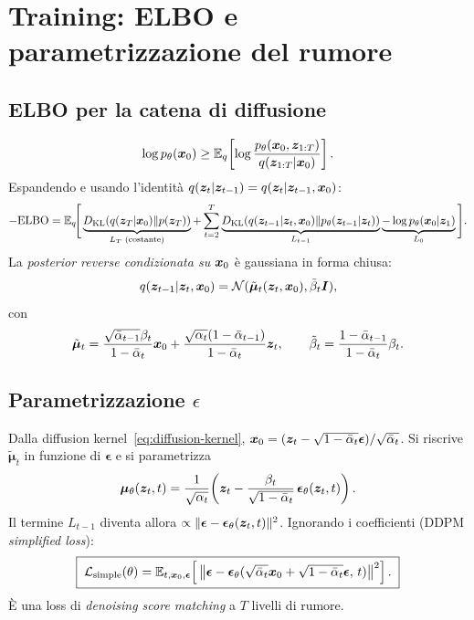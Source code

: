 \section{Training: ELBO e parametrizzazione del rumore}

\subsection{ELBO per la catena di diffusione}
\[
\log p_\theta(\bm{x}_0) \geq \mathbb{E}_q\!\left[\log \frac{p_\theta(\bm{x}_0, \bm{z}_{1:T})}{q(\bm{z}_{1:T}|\bm{x}_0)}\right].
\]
Espandendo e usando l'identità $q(\bm{z}_t|\bm{z}_{t-1}) = q(\bm{z}_t|\bm{z}_{t-1},\bm{x}_0)$:
\[
-\text{ELBO} = \mathbb{E}_q\!\Bigg[\underbrace{D_{\mathrm{KL}}\!\left(q(\bm{z}_T|\bm{x}_0) \| p(\bm{z}_T)\right)}_{L_T \text{ (costante)}} + \sum_{t=2}^T \underbrace{D_{\mathrm{KL}}\!\left(q(\bm{z}_{t-1}|\bm{z}_t,\bm{x}_0) \| p_\theta(\bm{z}_{t-1}|\bm{z}_t)\right)}_{L_{t-1}} \underbrace{- \log p_\theta(\bm{x}_0|\bm{z}_1)}_{L_0}\Bigg].
\]
La \emph{posterior reverse condizionata su $\bm{x}_0$} è gaussiana in forma chiusa:
\[
q(\bm{z}_{t-1}|\bm{z}_t, \bm{x}_0) = \mathcal{N}(\tilde{\boldsymbol{\mu}}_t(\bm{z}_t, \bm{x}_0), \tilde\beta_t \bm{I}),
\]
con
\[
\tilde{\boldsymbol{\mu}}_t = \frac{\sqrt{\bar\alpha_{t-1}}\beta_t}{1-\bar\alpha_t} \bm{x}_0 + \frac{\sqrt{\alpha_t}(1-\bar\alpha_{t-1})}{1-\bar\alpha_t}\bm{z}_t, \qquad \tilde\beta_t = \frac{1-\bar\alpha_{t-1}}{1-\bar\alpha_t}\beta_t.
\]

\subsection{Parametrizzazione $\epsilon$}
Dalla diffusion kernel~\eqref{eq:diffusion-kernel}, $\bm{x}_0 = (\bm{z}_t - \sqrt{1-\bar\alpha_t}\boldsymbol{\epsilon})/\sqrt{\bar\alpha_t}$. Si riscrive $\tilde{\boldsymbol{\mu}}_t$ in funzione di $\boldsymbol{\epsilon}$ e si parametrizza
\[
\boldsymbol{\mu}_\theta(\bm{z}_t, t) = \frac{1}{\sqrt{\alpha_t}}\!\left(\bm{z}_t - \frac{\beta_t}{\sqrt{1-\bar\alpha_t}}\, \boldsymbol{\epsilon}_\theta(\bm{z}_t, t)\right).
\]
Il termine $L_{t-1}$ diventa allora $\propto \|\boldsymbol{\epsilon} - \boldsymbol{\epsilon}_\theta(\bm{z}_t, t)\|^2$. Ignorando i coefficienti (DDPM \emph{simplified loss}):
\begin{equation}\label{eq:ddpm-loss}
\boxed{\;\mathcal{L}_{\text{simple}}(\theta) = \mathbb{E}_{t,\bm{x}_0,\boldsymbol{\epsilon}}\!\left[\,\big\| \boldsymbol{\epsilon} - \boldsymbol{\epsilon}_\theta(\sqrt{\bar\alpha_t}\bm{x}_0 + \sqrt{1-\bar\alpha_t}\boldsymbol{\epsilon},\, t) \big\|^2 \right].\;}
\end{equation}
È una loss di \emph{denoising score matching} a $T$ livelli di rumore.

